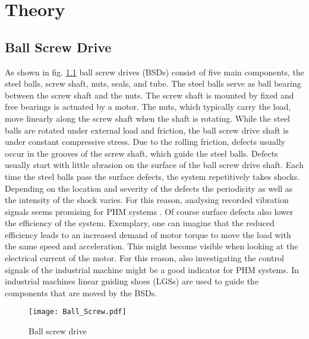 \chapter{Theory}\label{chapter:theory}

\section{Ball Screw Drive}
As shown in fig. \ref{fig:Ball_Screw} ball screw drives (BSDs) consist of five main components, the steel balls, screw shaft, nuts, seals, and tube. The steel balls serve as ball bearing between the screw shaft and the nuts. The screw shaft is mounted by fixed and free bearings is actuated by a motor. The nuts, which typically carry the load, move linearly along the screw shaft when the shaft is rotating. While the steel balls are rotated under external load and friction, the ball screw drive shaft is under constant compressive stress. Due to the rolling friction, defects usually occur in the grooves of the screw shaft, which guide the steel balls. Defects usually start with little abrasion on the surface of the ball screw drive shaft. Each time the steel balls pass the surface defects, the system repetitively takes shocks. Depending on the location and severity of the defects the periodicity as well as the intensity of the shock varies. For this reason, analysing recorded vibration signals seems promising for PHM systems \cite{Lee2015}. Of course surface defects also lower the efficiency of the system. Exemplary, one can imagine that the reduced efficiency leads to an increased demand of motor torque to move the load with the same speed and acceleration. This might become visible when looking at the electrical current of the motor. For this reason, also investigating the control signals of the industrial machine might be a good indicator for PHM systems. In industrial machines linear guiding shoes (LGSs) are used to guide the components that are moved by the BSDs.


\begin{figure}[H]
  \centering
  \texttt{[image: Ball\_Screw.pdf]}
  \caption {Ball screw drive \cite{DENG2020}} \label{fig:Ball_Screw}
\end{figure}

